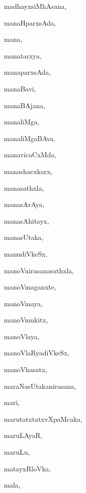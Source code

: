 \begin{multicols}{3}
{\noindent
{madhayxsiMhAsana}, \pageref{madhayxsiMhAsana}

\noindent
{manaHparxsAda}, \pageref{manaHparxsAda}

\noindent
{mana}, \pageref{mana}

\noindent
{manatarxya}, \pageref{manatarxya}

\noindent
{manaparxsAda}, \pageref{manaparxsAda}

\noindent
{manaBavi}, \pageref{manaBavi}

\noindent
{manaBAjana}, \pageref{manaBAjana}

\noindent
{manaliMga}, \pageref{manaliMga}

\noindent
{manaliMgaBAva}, \pageref{manaliMgaBAva}

\noindent
{manavicaCxMda}, \pageref{manavicaCxMda}

\noindent
{manashacxkarx}, \pageref{manashacxkarx}

\noindent
{manasathxla}, \pageref{manasathxla}

\noindent
{manasArAya}, \pageref{manasArAya}

\noindent
{manasAhitayx}, \pageref{manasAhitayx}

\noindent
{manasUtaka}, \pageref{manasUtaka}

\noindent
{manudiVkeSx}, \pageref{manudiVkeSx}

\noindent
{manoVnirasanasathxla}, \pageref{manoVnirasanasathxla}

\noindent
{manoVmaganxte}, \pageref{manoVmaganxte}

\noindent
{manoVmaya}, \pageref{manoVmaya}

\noindent
{manoVmukitx}, \pageref{manoVmukitx}

\noindent
{manoVlaya}, \pageref{manoVlaya}

\noindent
{manoVlaRyadiVkeSx}, \pageref{manoVlaRyadiVkeSx}

\noindent
{manoVhasatx}, \pageref{manoVhasatx}

\noindent
{maraNasUtakanirasana}, \pageref{maraNasUtakanirasana}

\noindent
{mari}, \pageref{mari}

\noindent
{marutatxtatxvXpaMcaka}, \pageref{marutatxtatxvXpaMcaka}

\noindent
{maruLAyaR}, \pageref{maruLAyaR}

\noindent
{maruLu}, \pageref{maruLu}

\noindent
{matayxRloVka}, \pageref{matayxRloVka}

\noindent
{mala}, \pageref{mala}

}
\end{multicols}
